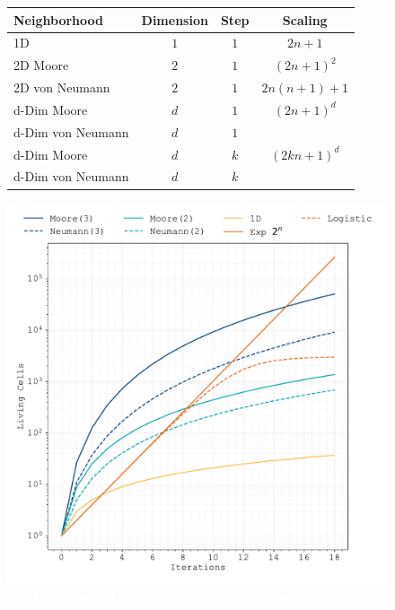 \documentclass{article}
\newcommand{\todo}[1]{\colorbox{WildStrawberry}{\textcolor{white}{#1}}}
\begin{document}
\begin{figure}
    \begin{minipage}{0.5\textwidth}
        \centering
        \begin{tabular}{lccc}
            Neighborhood & Dimension & Step & Scaling\\
            \midrule
            1D                  & $1$ & $1$ & $2n+1$\\
            2D Moore            & $2$ & $1$ & $(2n+1)^2$\\
            2D von Neumann      & $2$ & $1$ & $2n(n+1)+1$\\
            d-Dim Moore         & $d$ & $1$ & $(2n+1)^d$\\
            d-Dim von Neumann   & $d$ & $1$ & \todo{calculate it}\\
            d-Dim Moore  & $d$ & $k$ & $(2kn+1)^d$\\
            d-Dim von Neumann & $d$ & $k$ & \todo{calculate it}
        \end{tabular}
    \end{minipage}%
    \hspace{0.05\textwidth}%
    \begin{minipage}{0.44\textwidth}
        \includegraphics[width=\textwidth]{ca-rules/ca-scaling.pdf}
    \end{minipage}
    \caption{\todo{insert new image of various scalings; caption for image}}
    \label{fig:ca-scaling}
\end{figure}
\end{document}
